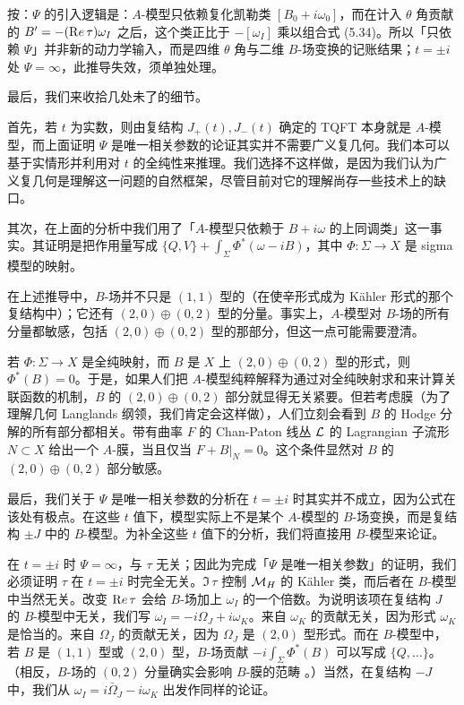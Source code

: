 \begin{yizhu}[含糊点拨]
按：$\Psi$ 的引入逻辑是：$A$-模型只依赖复化凯勒类 $[B_0+i\omega_0]$，而在计入 $\theta$ 角贡献的 $B'=-({\rm Re}\,\tau)\omega_I$ 之后，这个类正比于 $-[\omega_I]$ 乘以组合式 (5.34)。所以「只依赖 $\Psi$」并非新的动力学输入，而是四维 $\theta$ 角与二维 $B$-场变换的记账结果；$t=\pm i$ 处 $\Psi=\infty$，此推导失效，须单独处理。
\end{yizhu}

\par{}

最后，我们来收拾几处未了的细节。

首先，若 $t$ 为实数，则由复结构 $J_+(t),J_-(t)$ 确定的 TQFT 本身就是 $A$-模型，而上面证明 $\Psi$ 是唯一相关参数的论证其实并不需要广义复几何。我们本可以基于实情形并利用对 $t$ 的全纯性来推理。我们选择不这样做，是因为我们认为广义复几何是理解这一问题的自然框架，尽管目前对它的理解尚存一些技术上的缺口。

其次，在上面的分析中我们用了「$A$-模型只依赖于 $B+i\omega$ 的上同调类」这一事实。其证明是把作用量写成 $\{Q,V\}+\int_\Sigma \Phi^*(\omega-iB)$，其中 $\Phi:\Sigma\to X$ 是 sigma 模型的映射。

在上述推导中，$B$-场并不只是 $(1,1)$ 型的（在使辛形式成为 Kähler 形式的那个复结构中）；它还有 $(2,0)\oplus (0,2)$ 型的分量。事实上，$A$-模型对 $B$-场的所有分量都敏感，包括 $(2,0)\oplus (0,2)$ 型的那部分，但这一点可能需要澄清。

若 $\Phi:\Sigma\to X$ 是全纯映射，而 $B$ 是 $X$ 上 $(2,0)\oplus (0,2)$ 型的形式，则 $\Phi^*(B)=0$。于是，如果人们把 $A$-模型纯粹解释为通过对全纯映射求和来计算关联函数的机制，$B$ 的 $(2,0)\oplus (0,2)$ 部分就显得无关紧要。但若考虑膜（为了理解几何 Langlands 纲领，我们肯定会这样做），人们立刻会看到 $B$ 的 Hodge 分解的所有部分都相关。带有曲率 $F$ 的 Chan-Paton 线丛 ${\cal L}$ 的 Lagrangian 子流形 $N\subset X$ 给出一个 $A$-膜，当且仅当 $F+B|_N=0$。这个条件显然对 $B$ 的 $(2,0)\oplus (0,2)$ 部分敏感。

最后，我们关于 $\Psi$ 是唯一相关参数的分析在 $t=\pm i$ 时其实并不成立，因为公式在该处有极点。在这些 $t$ 值下，模型实际上不是某个 $A$-模型的 $B$-场变换，而是复结构 $\pm J$ 中的 $B$-模型。为补全这些 $t$ 值下的分析，我们将直接用 $B$-模型来论证。

在 $t=\pm i$ 时 $\Psi=\infty$，与 $\tau$ 无关；因此为完成「$\Psi$ 是唯一相关参数」的证明，我们必须证明 $\tau$ 在 $t=\pm i$ 时完全无关。${\Im}\,\tau$ 控制 $\MH$ 的 Kähler 类，而后者在 $B$-模型中当然无关。改变 ${\rm Re}\,\tau$ 会给 $B$-场加上 $\omega_I$ 的一个倍数。为说明该项在复结构 $J$ 的 $B$-模型中无关，我们写 $\omega_I=-i\Omega_J+i\omega_K$。来自 $\omega_K$ 的贡献无关，因为形式 $\omega_K$ 是恰当的。来自 $\Omega_J$ 的贡献无关，因为 $\Omega_J$ 是 $(2,0)$ 型形式。而在 $B$-模型中，若 $B$ 是 $(1,1)$ 型或 $(2,0)$ 型，$B$-场贡献 $-i\int_\Sigma\Phi^*(B)$ 可以写成 $\{Q,\dots\}$。（相反，$B$-场的 $(0,2)$ 分量确实会影响 $B$-膜的范畴 \cite{ref71}。）当然，在复结构 $-J$ 中，我们从 $\omega_I=i\bar\Omega_J-i\omega_K$ 出发作同样的论证。

